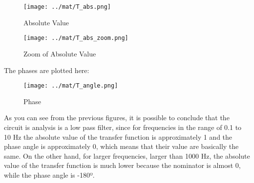 %


\begin{figure}[h]
      \texttt{[image: ../mat/T\_abs.png]}
      \caption{Absolute Value}
    \endminipage\hfill
      \texttt{[image: ../mat/T\_abs\_zoom.png]} %
      \caption{Zoom of Absolute Value}
    \endminipage\hfill
\end{figure}

\vspace{1cm}

The phases are plotted here:

\begin{figure}[h]
   \texttt{[image: ../mat/T\_angle.png]}
    \centering
    \caption{Phase}
    \label{phase}
\end{figure}



As you can see from the previous figures, it is possible to conclude that the circuit is analysis is a low pass filter, since for frequencies in the range of 0.1 to 10 Hz the absolute value of the transfer function is approximately 1 and the phase angle is approximately 0, which means that their value are basically the same. On the other hand, for larger frequencies, larger than 1000 Hz, the absolute value of the transfer function is much lower because the nominator is almost 0, while the phase angle is -180º.
